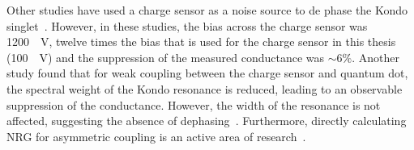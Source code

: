 Other studies have used a charge sensor as a noise source to de phase the Kondo singlet~\cite{kondo_controlled_dephasing}. However, in these studies, the bias across the charge sensor was \qty{1200}{\mu V}, twelve times the bias that is used for the charge sensor in this thesis (\qty{100}{\mu V}) and the suppression of the measured conductance was $\sim6\%$. Another study found that for weak coupling between the charge sensor and quantum dot, the spectral weight of the Kondo resonance is reduced, leading to an observable suppression of the conductance. However, the width of the resonance is not affected, suggesting the absence of dephasing~\cite{peculiar_dephasing_of_kondo}. Furthermore, directly calculating NRG for asymmetric coupling is an active area of research~\cite{kondo_nrg_asymmetric}.







